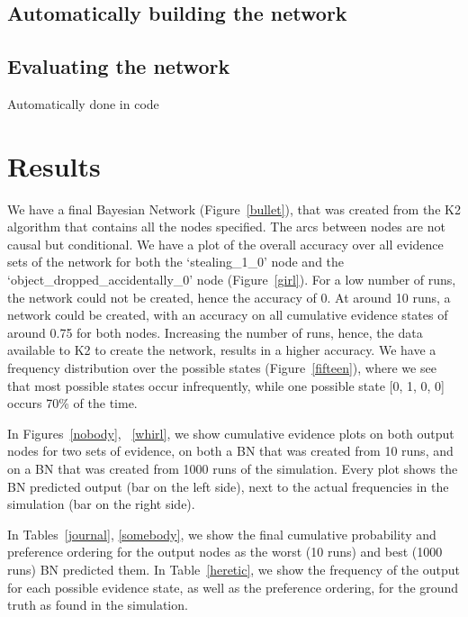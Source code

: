\documentclass[11pt]{article}
\begin{document}
\subsection{Automatically building the network}



\subsection{Evaluating the network}
Automatically done in code




\newpage

\section{Results}



We have a final Bayesian Network (Figure~\ref{bullet}), that was created from the K2 algorithm that contains all the nodes specified. The arcs between nodes are not causal but conditional. We have a plot of the overall accuracy over all evidence sets of the network for both the `stealing\_1\_0' node and the `object\_dropped\_accidentally\_0' node (Figure~\ref{girl}). For a low number of runs, the network could not be created, hence the accuracy of 0. At around 10 runs, a network could be created, with an accuracy on all cumulative evidence states of around 0.75 for both nodes. Increasing the number of runs, hence, the data available to K2 to create the network, results in a higher accuracy. We have a frequency distribution over the possible states (Figure~\ref{fifteen}), where we see that most possible states occur infrequently, while one possible state [0, 1, 0, 0] occurs 70\% of the time. 

In Figures~\ref{nobody}, ~\ref{whirl}, we show cumulative evidence plots on both output nodes for two sets of evidence, on both a BN that was created from 10 runs, and on a BN that was created from 1000 runs of the simulation. Every plot shows the BN predicted output (bar on the left side), next to the actual frequencies in the simulation (bar on the right side).

In Tables~\ref{journal}, \ref{somebody}, we show the final cumulative probability and preference ordering for the output nodes as the worst (10 runs) and best (1000 runs) BN predicted them. In Table~\ref{heretic}, we show the frequency of the output for each possible evidence state, as well as the preference ordering, for the ground truth as found in the simulation.
\end{document}
